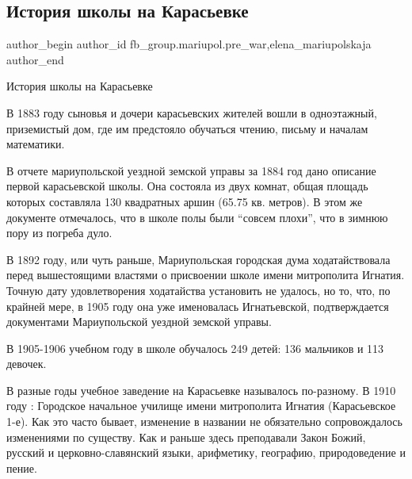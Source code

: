  
 
 
 
 

\subsection{История школы на Карасьевке}
\label{sec:07_03_2023.fb.fb_group.mariupol.pre_war.2.istoriya_shkoli_na_k}
 
\ifcmt
 author_begin
   author_id fb_group.mariupol.pre_war,elena_mariupolskaja
 author_end
\fi

История школы на Карасьевке

В 1883 году сыновья и дочери карасьевских жителей вошли в одноэтажный,
приземистый дом, где им предстояло обучаться чтению, письму и началам
математики.

В отчете мариупольской уездной земской управы за 1884 год дано описание первой
карасьевской школы. Она состояла из двух комнат, общая площадь которых
составляла 130 квадратных аршин (65.75 кв. метров). В этом же документе
отмечалось, что в школе полы были \enquote{совсем плохи}, что в зимнюю пору из погреба
дуло.

В 1892 году, или чуть раньше, Мариупольская городская дума ходатайствовала
перед вышестоящими властями о присвоении школе имени митрополита Игнатия.
Точную дату удовлетворения ходатайства установить не удалось, но то, что, по
крайней мере, в 1905 году она уже именовалась Игнатьевской, подтверждается
документами Мариупольской уездной земской управы.

В 1905-1906 учебном году в школе обучалось 249 детей: 136 мальчиков и 113
девочек. 

В разные годы учебное заведение на Карасьевке называлось по-разному. В 1910
году : Городское начальное училище имени митрополита Игнатия (Карасьевское
1-е). Как это часто бывает, изменение в названии не обязательно сопровождалось
изменениями по существу. Как и раньше здесь преподавали Закон Божий, русский и
церковно-славянский языки, арифметику, географию, природоведение и пение.

